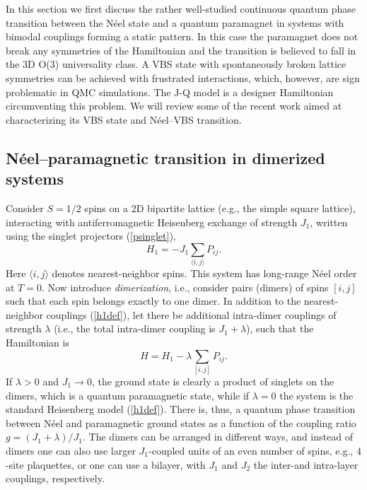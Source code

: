 \documentclass[range]{ar2e}
\begin{document}
In this section we first discuss the rather well-studied continuous quantum phase transition between the N\'eel state and a quantum paramagnet in systems 
with bimodal couplings forming a static pattern. In this case the paramagnet does not break any symmetries of the Hamiltonian and the transition 
is believed to fall in the 3D O($3$) universality class. A VBS state with spontaneously broken lattice symmetries can be achieved with frustrated 
interactions, which, however, are sign problematic in QMC simulations. The J-Q model \cite{Sandvik07} is a designer Hamiltonian circumventing this 
problem. We will review some of the recent work aimed at characterizing its VBS state and  N\'eel--VBS transition.

\subsection{N\'eel--paramagnetic transition in dimerized systems}

Consider $S=1/2$ spins on a 2D bipartite lattice (e.g., the simple square lattice), interacting with antiferromagnetic Heisenberg exchange of 
strength $J_1$, written using the singlet projectors (\ref{psinglet}),
\begin{equation}
H_1 = -J_1 \sum_{\langle i,j\rangle} P_{ij}.
\label{h1def}
\end{equation}
Here $\langle i,j\rangle$ denotes nearest-neighbor spins. This system has long-range N\'eel order at $T=0$. Now introduce {\it dimerization}, 
i.e., consider pairs (dimers) of spins $[i,j]$ such that each spin belongs exactly to one dimer. In addition to the nearest-neighbor couplings (\ref{h1def}),
let there be additional intra-dimer couplings of strength $\lambda$ (i.e., the total intra-dimer coupling is $J_1+\lambda$), such that the Hamiltonian is
\begin{equation}
H = H_1  -\lambda \sum_{[ i,j]} P_{ij} .
\end{equation}
If $\lambda>0$ and $J_1\to 0$, the ground state is clearly a product of singlets on the dimers, which is a quantum paramagnetic state, while if $\lambda=0$ 
the system is the standard Heisenberg model (\ref{h1def}). There is, thus, a quantum phase transition between N\'eel and paramagnetic ground states as a 
function of the coupling ratio $g=(J_1+\lambda)/J_1$. The dimers can be arranged in different ways, and instead of dimers one can also use larger $J_1$-coupled 
units of an even number of spins, e.g., $4$-site plaquettes, or one can use a bilayer, with $J_1$ and $J_2$ the inter-and intra-layer couplings, respectively.
\end{document}
